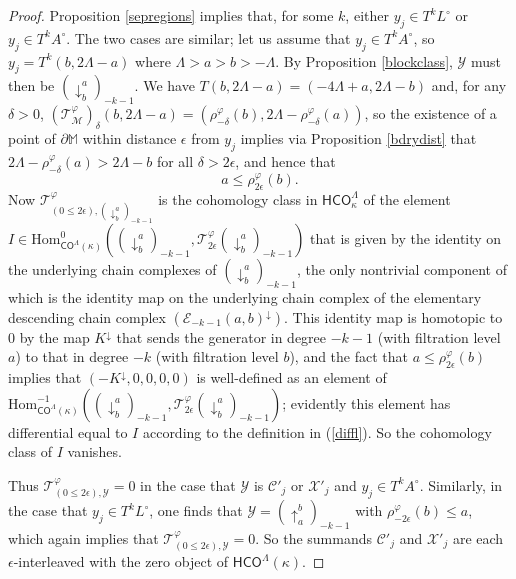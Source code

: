 \documentclass[11pt]{amsart}
\theoremstyle{definition}
\theoremstyle{remark}
\numberwithin{equation}{section}
\def\ep{\epsilon}
\begin{document}
\begin{proof}
   Proposition \ref{sepregions} implies that, for some $k$, either $y_j\in T^kL^{\circ}$ or $y_j\in T^kA^{\circ}$.  The two cases are similar; let us assume that $y_j\in T^kA^{\circ}$, so $y_j=T^k(b,2\Lambda-a)$ where $\Lambda>a>b>-\Lambda$.  By Proposition \ref{blockclass},  $\mathcal{Y}$ must then be $(\downarrow^{a}_{b})_{-k-1}$.  We have $T(b,2\Lambda-a)=(-4\Lambda+a,2\Lambda-b)$ and, for any $\delta>0$, $(\mathcal{T}_{\mathcal{M}}^{\varphi})_{\delta}(b,2\Lambda-a)= (\rho_{-\delta}^{\varphi}(b),2\Lambda-\rho_{-\delta}^{\varphi}(a))$, so the existence of a point of $\partial\mathbb{M}$ within distance $\ep$ from $y_j$ implies via Proposition \ref{bdrydist} that $2\Lambda-\rho_{-\delta}^{\varphi}(a)>2\Lambda-b$ for all $\delta>2\ep$, and hence that \[ a\leq \rho_{2\ep}^{\varphi}(b).\] %
   Now $\mathcal{T}^{\varphi}_{(0\leq 2\ep),(\downarrow_{b}^{a})_{-k-1}}$ is the cohomology class in $\mathsf{HCO}^{\Lambda}_{\kappa}$ of the element \\$I\in \mathrm{Hom}^0_{\mathsf{CO}^{\Lambda}(\kappa)}(( \downarrow_{b}^{a})_{-k-1},\mathcal{T}^{\varphi}_{2\ep}(\downarrow_{b}^{a})_{-k-1})$ that is given by the identity on the underlying chain complexes of $(\downarrow_{b}^{a})_{-k-1}$, the only nontrivial component of which is the identity map on the underlying chain complex of the elementary descending chain complex $(\mathcal{E}_{-k-1}(a,b)^{\downarrow})$.  This identity map is homotopic to $0$ by the map $K^{\downarrow}$ that sends the generator in degree $-k-1$ (with filtration level $a$) to that in degree $-k$ (with filtration level $b$),  and the fact that $a\leq \rho_{2\ep}^{\varphi}(b)$ implies that $(-K^{\downarrow},0,0,0,0)$ is well-defined as an element of $\mathrm{Hom}_{\mathsf{CO}^{\Lambda}(\kappa)}^{-1}\left(( \downarrow_{b}^{a})_{-k-1},\mathcal{T}^{\varphi}_{2\ep}(\downarrow_{b}^{a})_{-k-1}  \right)$; evidently this element has differential equal to $I$ according to the definition in (\ref{diffl}).  So the cohomology class of $I$ vanishes.
 
Thus $\mathcal{T}^{\varphi}_{(0\leq 2\ep),\mathcal{Y}}=0$ in the case that $\mathcal{Y}$ is $\mathcal{C}'_j$ or $\mathcal{X}'_j$ and $y_j\in T^k A^{\circ}$.  Similarly, in the case that $y_j\in T^kL^{\circ}$, one finds that $\mathcal{Y}=(\uparrow_{a}^{b})_{-k-1}$ with $\rho_{-2\ep}^{\varphi}(b)\leq a$, which again implies that $\mathcal{T}^{\varphi}_{(0\leq 2\ep),\mathcal{Y}}=0$.  So the summands $\mathcal{C}'_j$ and $\mathcal{X}'_j$ are each $\ep$-interleaved with the zero object of $\mathsf{HCO}^{\Lambda}(\kappa)$.


\end{proof}
\end{document}
